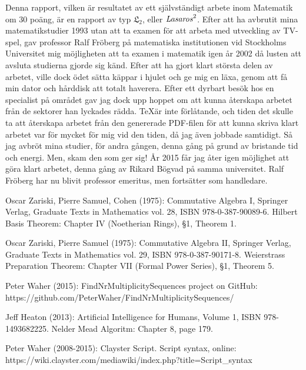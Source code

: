 \documentclass[twoside]{report}
\begin{document}
Denna rapport, vilken är resultatet av ett självständigt arbete inom Matematik om 30 poäng, är en rapport av typ $\mathfrak{L}_2$, eller $\text{\emph{Lasaros}}^2$. Efter att ha avbrutit mina matematikstudier 1993 utan att ta examen för att arbeta med utveckling av TV-spel, gav professor Ralf Fröberg på matematiska institutionen vid Stockholms Universitet mig möjligheten att ta examen i matematik igen år 2002 då lusten att avsluta studierna gjorde sig känd. Efter att ha gjort klart största delen av arbetet, ville dock ödet sätta käppar i hjulet och ge mig en läxa, genom att få min dator och hårddisk att totalt haverera. Efter ett dyrbart besök hos en specialist på området gav jag dock upp hoppet om att kunna återskapa arbetet från de sektorer han lyckades rädda. \TeX är inte förlåtande, och tiden det skulle ta att återskapa arbetet från den genererade PDF-filen för att kunna skriva klart arbetet var för mycket för mig vid den tiden, då jag även jobbade samtidigt. Så jag avbröt mina studier, för andra gången, denna gång på grund av bristande tid och energi. Men, skam den som ger sig! År 2015 får jag åter igen möjlighet att göra klart arbetet, denna gång av Rikard Bögvad på samma universitet. Ralf Fröberg har nu blivit professor emeritus, men fortsätter som handledare. 


\tableofcontents{}







\appendix{}






\begin{thebibliography}{99}
 Oscar Zariski, Pierre Samuel, Cohen (1975): Commutative Algebra I, Springer Verlag, Graduate Texts in Mathematics vol. 28, ISBN 978-0-387-90089-6. Hilbert Basis Theorem: Chapter IV (Noetherian Rings), §1, Theorem 1.

 Oscar Zariski, Pierre Samuel (1975): Commutative Algebra II, Springer Verlag, Graduate Texts in Mathematics vol. 29, ISBN 978-0-387-90171-8. Weierstrass Preparation Theorem: Chapter VII (Formal Power Series), §1, Theorem 5.

 Peter Waher (2015): FindNrMultiplicitySequences project on GitHub: https://github.com/PeterWaher/FindNrMultiplicitySequences/

 Jeff Heaton (2013): Artificial Intelligence for Humans, Volume 1, ISBN 978-1493682225. Nelder Mead Algoritm: Chapter 8, page 179.

 Peter Waher (2008-2015): Clayster Script. Script syntax, online: https://wiki.clayster.com/mediawiki/index.php?title=Script\_syntax

\end{thebibliography}
\end{document}
